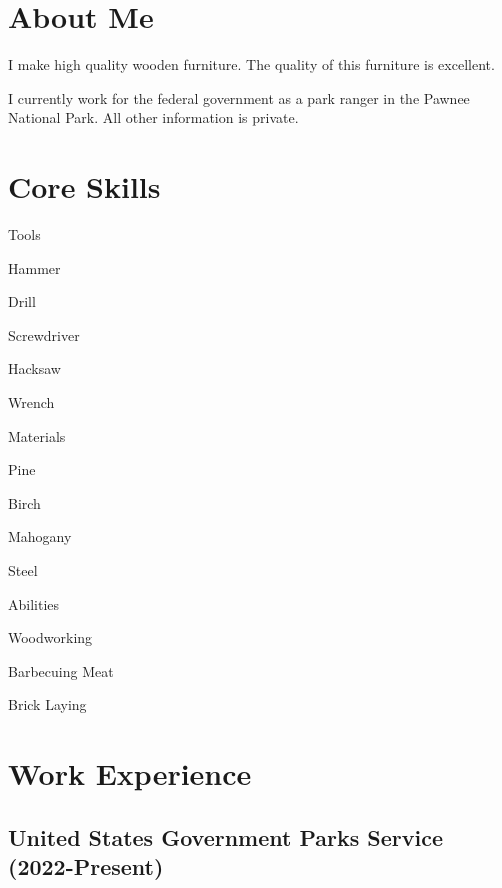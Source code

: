 \documentclass{minimal-cv}
\begin{document}

\section{About Me}
\sectionicon{\person}

I make high quality wooden furniture. The quality of this furniture is
excellent.

I currently work for the federal government as a park ranger in the Pawnee
National Park. All other information is private.

\section{Core Skills}
\sectionicon{\hammer}

\begin{coreskillslist}[0.33\textwidth]{Tools}
	\item Hammer
	\item Drill
	\item Screwdriver
	\item Hacksaw
	\item Wrench
\end{coreskillslist}%
\begin{coreskillslist}[0.33\textwidth]{Materials}
	\item Pine
	\item Birch
	\item Mahogany
	\item Steel
\end{coreskillslist}%
\begin{coreskillslist}[0.33\textwidth]{Abilities}
	\item Woodworking
	\item Barbecuing Meat
	\item Brick Laying
\end{coreskillslist}

\section{Work Experience}
\sectionicon{\laptop}

\subsection{United States Government Parks Service (2022-Present)}
\begin{employment}
\end{employment}
\end{document}
